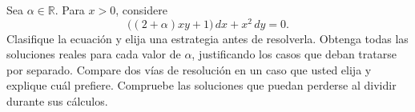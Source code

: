 Sea \(\alpha\in\mathbb R\). Para \(x>0\), considere
\[
\bigl((2+\alpha)xy+1\bigr)\,dx+x^2\,dy=0.
\]
Clasifique la ecuación y elija una estrategia antes de resolverla. Obtenga todas las soluciones reales para cada valor de \(\alpha\), justificando los casos que deban tratarse por separado. Compare dos vías de resolución en un caso que usted elija y explique cuál prefiere. Compruebe las soluciones que puedan perderse al dividir durante sus cálculos.
